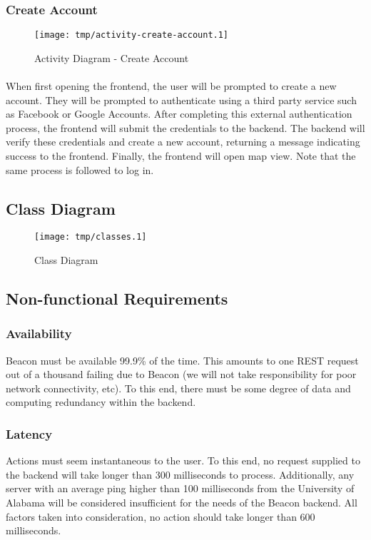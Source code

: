         \subsubsection{Create Account}
        \begin{figure}[H]
            \centering
            \texttt{[image: tmp/activity-create-account.1]} 
            \caption{Activity Diagram - Create Account}
        \end{figure}

        \paragraph*{}
        When first opening the frontend, the user will be prompted to create a new
        account. They will be prompted to authenticate using a third party service
        such as Facebook or Google Accounts. After completing this external
        authentication process, the frontend will submit the credentials to the
        backend. The backend will verify these credentials and create a new account,
        returning a message indicating success to the frontend. Finally, the frontend
        will open map view. Note that the same process is followed to log in.

    \subsection{Class Diagram}
        \begin{figure}[H]
            \centering
            \texttt{[image: tmp/classes.1]} 
            \caption{Class Diagram}
        \end{figure}

    \subsection{Non-functional Requirements}
        \subsubsection{Availability} 
        Beacon must be available 99.9\% of the time. This amounts to one REST request
        out of a thousand failing due to Beacon (we will not take responsibility for
        poor network connectivity, etc). To this end, there must be some degree of data
        and computing redundancy within the backend.

        \subsubsection{Latency}
        Actions must seem instantaneous to the user. To this end, no request supplied
        to the backend will take longer than 300 milliseconds to process. Additionally,
        any server with an average
        ping higher than 100 milliseconds from the University of Alabama will be
        considered insufficient for the needs of the Beacon backend. All factors taken
        into consideration, no action should take longer than 600 milliseconds.

